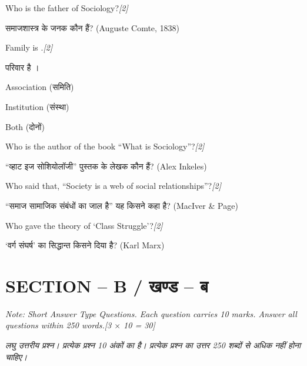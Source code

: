 \documentclass[11pt,a4paper]{article}
\newcommand{\pts}[1]{\hfill \textit{[#1]}}
\begin{document}
\begin{enumerate}[label=\textbf{\arabic*.},leftmargin=*,itemsep=8pt]
  \item 
  \begin{parts}
    \item Who is the father of Sociology?\pts{2}
    
    समाजशास्त्र के जनक कौन हैं? (Auguste Comte, 1838)

    \item Family is \underline{\hspace{3cm}}.\pts{2}
    
    परिवार है \underline{\hspace{3cm}}।
    \begin{parts}
      \item Association (समिति)
      \item Institution (संस्था)
      \item Both (दोनों)
    \end{parts}

    \item Who is the author of the book ``What is Sociology''?\pts{2}
    
    ``व्हाट इज सोशियोलॉजी'' पुस्तक के लेखक कौन हैं? (Alex Inkeles)

    \item Who said that, ``Society is a web of social relationships''?\pts{2}
    
    ``समाज सामाजिक संबंधों का जाल है'' यह किसने कहा है? (MacIver \& Page)

    \item Who gave the theory of `Class Struggle'?\pts{2}
    
    `वर्ग संघर्ष' का सिद्धान्त किसने दिया है? (Karl Marx)
  \end{parts}
\end{enumerate}

\bigskip

\section*{SECTION -- B / खण्ड -- ब}
\noindent \textit{Note: Short Answer Type Questions. Each question carries 10 marks. Answer all questions within 250 words.}\pts{3 $\times$ 10 = 30}

\noindent \textit{लघु उत्तरीय प्रश्न। प्रत्येक प्रश्न 10 अंकों का है। प्रत्येक प्रश्न का उत्तर 250 शब्दों से अधिक नहीं होना चाहिए।}
\end{document}
